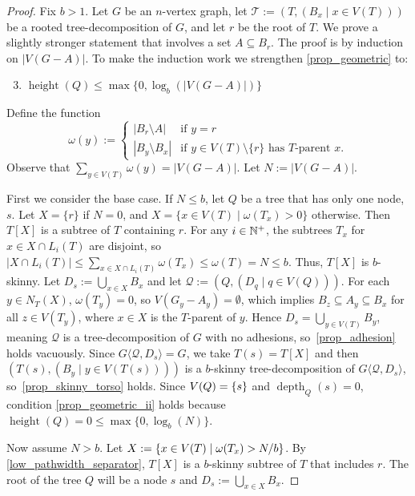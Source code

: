 \documentclass{patmorin}
\renewcommand{\le}{\leqslant}
\newcommand{\torso}[2]{{#1}\langle{#2}\rangle}
\DeclareMathOperator{\height}{height}
\DeclareMathOperator{\depth}{depth}
\DeclarePairedDelimiter{\set}{\{}{\}}
\begin{document}
\begin{proof}
  Fix $b>1$.    Let $G$ be an $n$-vertex graph, let $\mathcal{T}:=(T,(B_x\mid x\in V(T)))$ be a rooted tree-decomposition of $G$, and let $r$ be the root of $T$.  We prove a slightly stronger statement that involves a set $A\subseteq B_r$.  The proof is by induction on $|V(G-A)|$.   To make the induction work we strengthen \ref{prop_geometric} to:
  \begin{enumerate}[nosep,nolistsep,label=\rm(\alph*')]
    \setcounter{enumi}{2}
    \item\label{prop_geometric_ii} $\height(Q) \le \max\{0, \log_b(|V(G-A)|)\}$
  \end{enumerate}

  Define the function
  \[
    \omega(y) := \begin{cases}
      |B_r\setminus A|   & \text{if $y=r$}                                         \\
      |B_y\setminus B_x| & \text{if $y\in V(T)\setminus\{r\}$ has $T$-parent $x$.}
    \end{cases}
  \]
  Observe that $\sum_{y\in V(T)}\omega(y)=|V(G-A)|$. Let $N:=|V(G-A)|$.

  First we consider the base case. If $N\le b$, let $Q$ be a tree that has only one node, $s$. Let $X=\{r\}$ if $N=0$, and $X=\{x\in V(T)\mid \omega(T_x)>0\}$ otherwise. Then $T[X]$ is a subtree of $T$ containing $r$. For any $i\in\mathbb{N}^+$, the subtrees $T_x$ for $x\in X\cap L_i(T)$ are disjoint, so $|X\cap L_i(T)| \le \sum_{x\in X\cap L_i(T)}\omega(T_x) \le \omega(T) = N \le b$. Thus, $T[X]$ is $b$-skinny. Let $D_s:=\bigcup_{x\in X} B_x$ and let $\mathcal{Q}:=(Q,(D_q\mid q\in V(Q)))$. For each $y\in N_T(X)$, $\omega(T_y)=0$, so $V(G_y-A_y)=\emptyset$, which implies $B_z\subseteq A_y\subseteq B_x$ for all $z\in V(T_y)$, where $x\in X$ is the $T$-parent of $y$. Hence $D_s=\bigcup_{y\in V(T)} B_y$, meaning $\mathcal{Q}$ is a tree-decomposition of $G$ with no adhesions, so~\ref{prop_adhesion} holds vacuously. Since $\torso{G}{\mathcal{Q},D_s}=G$, we take $T(s)=T[X]$ and then $(T(s),(B_y\mid y\in V(T(s))))$ is a $b$-skinny tree-decomposition of $\torso{G}{\mathcal{Q},D_s}$, so~\ref{prop_skinny_torso} holds. Since $V(Q)=\set{s}$ and $\depth_Q(s)=0$, condition \ref{prop_geometric_ii} holds because $\height(Q)=0 \le \max\{0, \log_b(N)\}$.

  Now assume $N> b$. Let $X:=\set{x\in V(T)\mid  \omega(T_x)>N/b}$. By \cref{low_pathwidth_separator}, $T[X]$ is a $b$-skinny subtree of $T$ that includes $r$.  The root of the tree $Q$ will be a node $s$ and $D_s:=\bigcup_{x\in X} B_x$.


\end{proof}
\end{document}
